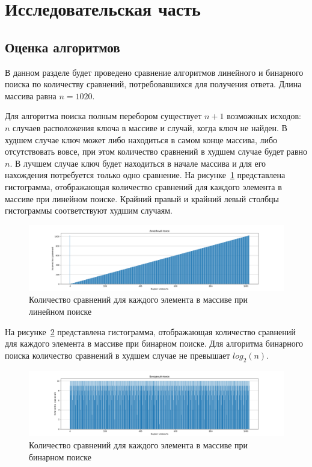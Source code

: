\section{Исследовательская часть}

\subsection{Оценка алгоритмов}

В данном разделе будет проведено сравнение алгоритмов линейного и бинарного поиска по количеству сравнений, потребовавшихся для получения ответа. Длина массива равна $n = 1020$. 

Для алгоритма поиска полным перебором существует $n + 1$ возможных исходов: $n$ случаев расположения ключа в массиве и случай, когда ключ не найден. В худшем случае ключ может либо находиться в самом конце массива, либо отсутствовать вовсе, при этом количество сравнений в худшем случае будет равно $n$. В лучшем случае ключ будет находиться в начале массива и для его нахождения потребуется только одно сравнение. На рисунке~\ref{fig:linear_hist} представлена гистограмма, отображающая количество сравнений для каждого элемента в массиве при линейном поиске. Крайний правый и крайний левый столбцы гистограммы соответствуют худшим случаям.

\begin{figure}[!htb]
\centering
\includegraphics[width=\textwidth]{img/linear_search_hist.png}
\caption{Количество сравнений для каждого элемента в массиве при линейном поиске}
\label{fig:linear_hist}
\end{figure}

На рисунке~\ref{fig:binary_hist} представлена гистограмма, отображающая количество сравнений для каждого элемента в массиве при бинарном поиске. Для алгоритма бинарного поиска количество сравнений в худшем случае не превышает $log_2(n)$.

\begin{figure}[!htb]
\centering
\includegraphics[width=\textwidth]{img/binary_search_hist.png}
\caption{Количество сравнений для каждого элемента в массиве при бинарном поиске}
\label{fig:binary_hist}
\end{figure}

